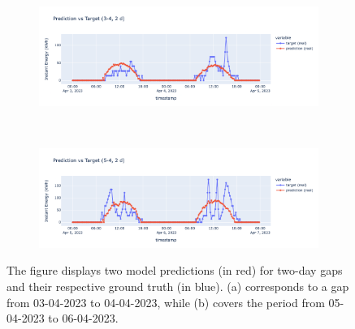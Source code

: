 
\begin{figure}[H]
	\centering
	\begin{subfigure}{\textwidth}
		\centering
		\includegraphics[width=\textwidth]{chapters/3_models/imgs/ufnc/eval/ufcpred3-4.png}
		\caption{}
	\end{subfigure}\\
	\begin{subfigure}{\textwidth}
		\centering
		\includegraphics[width=\textwidth]{chapters/3_models/imgs/ufnc/eval/ufcpred5-4.png}
		\caption{}
	\end{subfigure}
	\caption{The figure displays two model predictions (in red) for two-day gaps and their respective ground truth (in blue). (a) corresponds to a gap from 03-04-2023 to 04-04-2023, while (b) covers the period from 05-04-2023 to 06-04-2023.}
	\label{fig:ufcnevalbrutti}
\end{figure}

